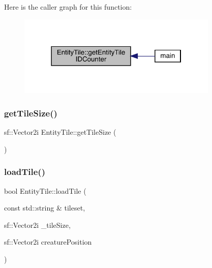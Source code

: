 Here is the caller graph for this function\+:
\nopagebreak
\begin{figure}[H]
\begin{center}
\leavevmode
\includegraphics[width=271pt]{class_entity_tile_acabd6691ddcf65a812c38e86e12e28e7_icgraph}
\end{center}
\end{figure}
\mbox{\label{class_entity_tile_a5b0c178bfb2b65842c9c70ffafd857a7}} 
\subsubsection{\texorpdfstring{get\+Tile\+Size()}{getTileSize()}}
{\footnotesize\ttfamily sf\+::\+Vector2i Entity\+Tile\+::get\+Tile\+Size (\begin{DoxyParamCaption}{ }\end{DoxyParamCaption})}

\mbox{\label{class_entity_tile_a1a6b6b995ad942e7850f14cc6e693bbc}} 
\subsubsection{\texorpdfstring{load\+Tile()}{loadTile()}}
{\footnotesize\ttfamily bool Entity\+Tile\+::load\+Tile (\begin{DoxyParamCaption}\item[{const std\+::string \&}]{tileset,  }\item[{sf\+::\+Vector2i}]{\+\_\+tile\+Size,  }\item[{sf\+::\+Vector2i}]{creature\+Position }\end{DoxyParamCaption})}

